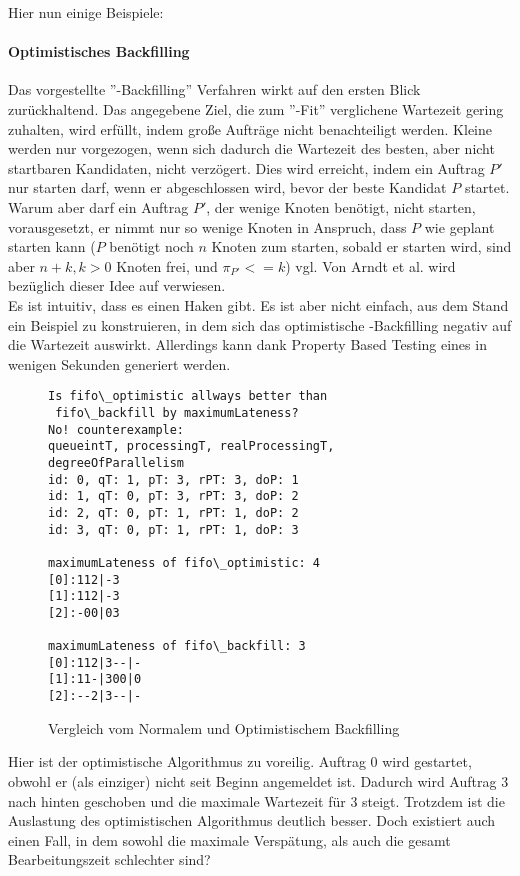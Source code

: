 Hier nun einige Beispiele:\\

\paragraph{Optimistisches Backfilling}
\label{optfill}
Das vorgestellte ''-Backfilling'' Verfahren wirkt auf den ersten Blick zurückhaltend. Das angegebene Ziel, die zum ''-Fit'' verglichene Wartezeit gering zuhalten, wird erfüllt, indem große Aufträge nicht benachteiligt werden. Kleine werden nur vorgezogen, wenn sich dadurch die Wartezeit des besten, aber nicht startbaren Kandidaten, nicht verzögert. Dies wird erreicht, indem ein Auftrag $P'$ nur starten darf, wenn er abgeschlossen wird, bevor der beste Kandidat $P$ startet.\\
Warum aber darf ein Auftrag $P'$, der wenige Knoten benötigt, nicht starten, vorausgesetzt, er nimmt nur so wenige Knoten in Anspruch, dass $P$ wie geplant starten kann ($P$ benötigt noch $n$ Knoten zum starten, sobald er starten wird, sind aber $n+k, k>0$ Knoten frei, und $\pi_{P'} <= k$) vgl. 
Von Arndt et al. wird bezüglich dieser Idee auf \cite{optVsCons} verwiesen.\\
Es ist intuitiv, dass es einen Haken gibt. Es ist aber nicht einfach, aus dem Stand ein Beispiel zu konstruieren, in dem sich das optimistische -Backfilling negativ auf die Wartezeit auswirkt. Allerdings kann dank Property Based Testing eines in wenigen Sekunden generiert werden.

\begin{figure}
\centering
\begin{verbatim}
Is fifo\_optimistic allways better than
 fifo\_backfill by maximumLateness?
No! counterexample:
queueintT, processingT, realProcessingT, degreeOfParallelism
id: 0, qT: 1, pT: 3, rPT: 3, doP: 1
id: 1, qT: 0, pT: 3, rPT: 3, doP: 2
id: 2, qT: 0, pT: 1, rPT: 1, doP: 2
id: 3, qT: 0, pT: 1, rPT: 1, doP: 3

maximumLateness of fifo\_optimistic: 4
[0]:112|-3
[1]:112|-3
[2]:-00|03

maximumLateness of fifo\_backfill: 3
[0]:112|3--|-
[1]:11-|300|0
[2]:--2|3--|-
\end{verbatim}
\caption{Vergleich vom Normalem und Optimistischem Backfilling}
\label{onlateness}
\end{figure}

\FloatBarrier

Hier ist der optimistische Algorithmus zu voreilig. Auftrag 0 wird gestartet, obwohl er (als einziger) nicht seit Beginn angemeldet ist. Dadurch wird Auftrag 3 nach hinten geschoben und die maximale Wartezeit für 3 steigt. Trotzdem ist die Auslastung des optimistischen Algorithmus deutlich besser. Doch existiert auch einen Fall, in dem sowohl die maximale Verspätung, als auch die gesamt Bearbeitungszeit schlechter sind?\\


